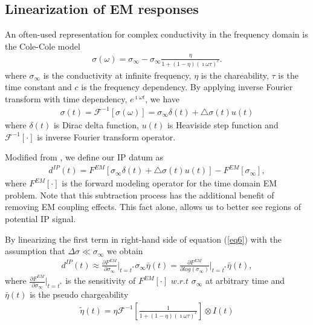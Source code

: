 \documentclass{segabs}
\begin{document}
\subsection*{Linearization of EM responses}
An often-used representation for complex conductivity in the frequency domain is the Cole-Cole model \cite[]{COLE}
\begin{eqnarray}
  \sigma(\omega) = \sigma_{\infty} - \sigma_{\infty}\frac{\eta}{1+(1-\eta)(\imath\omega\tau)^c}.
\end{eqnarray}
where $\sigma_{\infty}$ is the conductivity at infinite frequency, $\eta$ is the chareability, $\tau$ is the time constant and $c$ is the frequency dependency. By applying inverse Fourier transform with time dependency, $e^{\imath\omega t}$, we have
\begin{eqnarray}
  \sigma(t) = \mathscr{F}^{-1}[\sigma(\omega)] = \sigma_{\infty}\delta(t) + \triangle\sigma(t)u(t)
\end{eqnarray}
where $\delta(t)$ is Dirac delta function, $u(t)$ is Heaviside step function and $\mathscr{F}^{-1}[\cdot]$ is inverse Fourier transform operator.

Modified from \cite{routh2001}, we define our IP datum as
\begin{eqnarray}
  d^{IP}(t)  = F^{EM}[\sigma_{\infty}\delta(t)+\triangle\sigma(t)u(t)] - F^{EM}[\sigma_{\infty}],
  \label{eq6}
\end{eqnarray}
where $F^{EM}[\cdot]$ is the forward modeling operator for the time domain EM problem. Note that this subtraction process has the additional benefit of removing EM coupling effects. This fact alone, allows us to better see regions of potential IP signal.

By linearizing the first term in right-hand side of equation (\ref{eq6}) with the assumption that $\Delta \sigma \ll \sigma_{\infty}$ we obtain
\begin{eqnarray}
  d^{IP}(t)  \approx \frac{\partial F^{EM}}{\partial \sigma_{\infty}}\Big|_{t = t^{*}}\sigma_{\infty}\bar{\eta}(t)
  =  \frac{\partial F^{EM}}{\partial log(\sigma_{\infty})}\Big|_{t = t^{*}}\bar{\eta}(t),
  \label{eq7}
\end{eqnarray}
where $\frac{\partial F^{EM}}{\partial \sigma_{\infty}}\Big|_{t = t^{*}}$ is the sensitivity of $F^{EM}[\cdot]$ $w.r.t$ $\sigma_{\infty}$ at arbitrary time and $\bar{\eta}(t)$ is the pseudo chargeability
\begin{eqnarray}
  \tilde{\eta}(t) = \eta\mathscr{F}^{-1}[\frac{1}{1+(1-\eta)(\imath\omega\tau)^c}]\otimes I(t)
\end{eqnarray}
\end{document}
